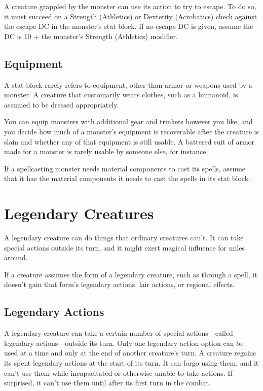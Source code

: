 A creature grappled by the monster can use its action to try to escape. To do so, it must succeed on a Strength (Athletics) or Dexterity (Acrobatics) check against the escape DC in the monster's stat block. If no escape DC is given, assume the DC is 10 + the monster's Strength (Athletics) modifier.

\subsection{Equipment}

A stat block rarely refers to equipment, other than armor or weapons used by a monster. A creature that customarily wears clothes, such as a humanoid, is assumed to be dressed appropriately.

You can equip monsters with additional gear and trinkets however you like, and you decide how much of a monster's equipment is recoverable after the creature is slain and whether any of that equipment is still usable. A battered suit of armor made for a monster is rarely usable by someone else, for instance.

If a spellcasting monster needs material components to cast its spells, assume that it has the material components it needs to cast the spells in its stat block.

\section{Legendary Creatures}

A legendary creature can do things that ordinary creatures can't. It can take special actions outside its turn, and it might exert magical influence for miles around.

If a creature assumes the form of a legendary creature, such as through a spell, it doesn't gain that form's legendary actions, lair actions, or regional effects.

\subsection{Legendary Actions}

A legendary creature can take a certain number of special actions—called legendary actions—outside its turn. Only one legendary action option can be used at a time and only at the end of another creature's turn. A creature regains its spent legendary actions at the start of its turn. It can forgo using them, and it can't use them while incapacitated or otherwise unable to take actions. If surprised, it can't use them until after its first turn in the combat.

